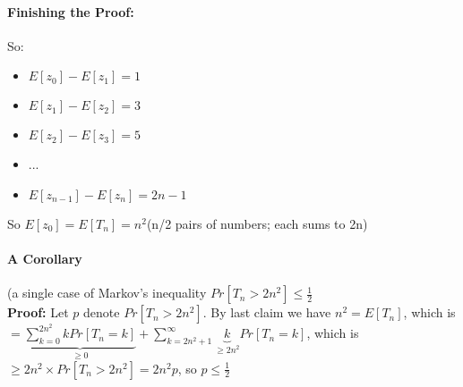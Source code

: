 \documentclass{scrartcl}
\begin{document}
\paragraph{Finishing the Proof:}
So:
\begin{itemize}
\item  $E[z_0] - E[z_1] = 1$
\item  $E[z_1] - E[z_2] = 3$
\item  $E[z_2] - E[z_3] = 5$
\item  ...
\item  $E[z_{n-1}] - E[z_n] = 2n - 1$
\end{itemize}
So $E[z_0] = E[T_n] = n^2$(n/2 pairs of numbers; each sums to 2n)

\paragraph{A Corollary} (a single case of Markov's inequality
$Pr[T_n > 2n^2] \leq \frac12$\\
{\bf Proof:} Let $p$ denote $Pr[T_n > 2n^2]$.
By last claim we have $n^2 = E[T_n]$, which is $ =\underbrace{\sum \limits _{k=0}^{2n^2} k Pr[T_n = k]}_{\geq 0} + \sum \limits_{k=2n^2 + 1}^\infty \underbrace{k}_{\geq 2n^2} Pr[T_n = k]$, which is\\
$\geq 2n^2 \times Pr[T_n > 2n^2] = 2n^2 p$, so $p \leq \frac12$

\end{document}
